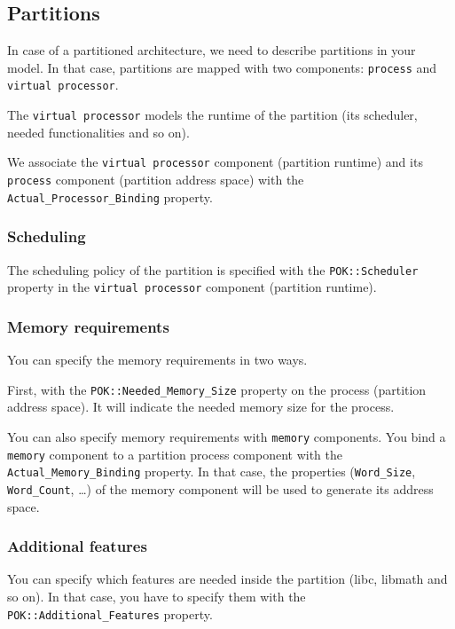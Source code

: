       \subsection{Partitions}
         In case of a partitioned architecture, we need to describe partitions
         in your \aadl model. In that case, partitions are mapped with two \aadl
         components: \texttt{process} and \texttt{virtual processor}.

         The \texttt{virtual processor} models the runtime of the partition (its
         scheduler, needed functionalities and so on).


         We associate the \texttt{virtual processor} component (partition
         runtime) and its \texttt{process} component (partition address space)
         with the \texttt{Actual\_Processor\_Binding} property.
         
         \subsubsection{Scheduling}
         The scheduling policy of the partition is specified with the
         \texttt{POK::Scheduler} property in the \texttt{virtual processor}
         component (partition runtime).

         \subsubsection{Memory requirements}
         You can specify the memory requirements in two ways.

         First, with the \texttt{POK::Needed\_Memory\_Size} property on the
         process (partition address space). It will indicate the needed memory
         size for the process.

         You can also specify memory requirements with \aadl \texttt{memory}
         components. You bind a \texttt{memory} component to a partition process
         component with the \texttt{Actual\_Memory\_Binding} property. In that
         case, the properties (\texttt{Word\_Size}, \texttt{Word\_Count},
         \ldots) of the memory component will be used to generate its address
         space.

         \subsubsection{Additional features}
         You can specify which features are needed inside the partition (libc,
         libmath and so on). In that case, you have to specify them with the
         \texttt{POK::Additional\_Features} property.

